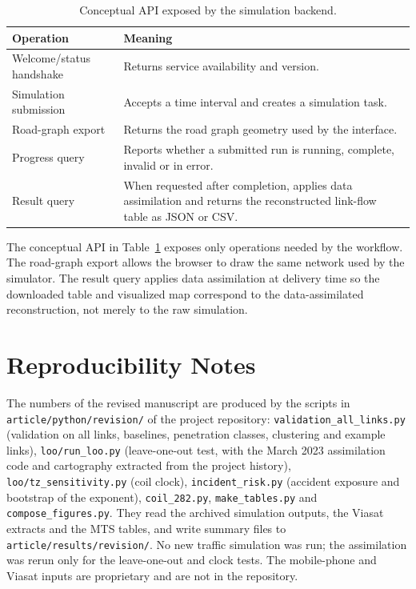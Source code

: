 \documentclass[11pt,a4paper]{article}
\newcommand{\code}[1]{\texttt{#1}}
\begin{document}
\begin{table}[htbp]
\centering
\caption{Conceptual API exposed by the simulation backend.}
\label{tab:web-api}
\begin{tabularx}{\linewidth}{@{}lX@{}}
\toprule
Operation & Meaning \\
\midrule
Welcome/status handshake & Returns service availability and version. \\
Simulation submission & Accepts a time interval and creates a simulation
task. \\
Road-graph export & Returns the road graph geometry used by the interface. \\
Progress query & Reports whether a submitted run is running, complete,
invalid or in error. \\
Result query & When requested after completion, applies data assimilation and
returns the reconstructed link-flow table as JSON or CSV. \\
\bottomrule
\end{tabularx}
\end{table}

The conceptual API in Table~\ref{tab:web-api} exposes only operations needed by the workflow. The road-graph export allows the browser to draw the same network used by the simulator. The result query applies data assimilation at delivery time so the downloaded table and visualized map correspond to the data-assimilated reconstruction, not merely to the raw simulation.

\section{Reproducibility Notes}
\label{sec:reproducibility}

The numbers of the revised manuscript are produced by the scripts in \code{article/python/revision/} of the project repository: \code{validation\_all\_links.py} (validation on all links, baselines, penetration classes, clustering and example links), \code{loo/run\_loo.py} (leave-one-out test, with the March 2023 assimilation code and cartography extracted from the project history), \code{loo/tz\_sensitivity.py} (coil clock), \code{incident\_risk.py} (accident exposure and bootstrap of the exponent), \code{coil\_282.py}, \code{make\_tables.py} and \code{compose\_figures.py}. They read the archived simulation outputs, the Viasat extracts and the MTS tables, and write summary files to \code{article/results/revision/}. No new traffic simulation was run; the assimilation was rerun only for the leave-one-out and clock tests. The mobile-phone and Viasat inputs are proprietary and are not in the repository.
\end{document}
